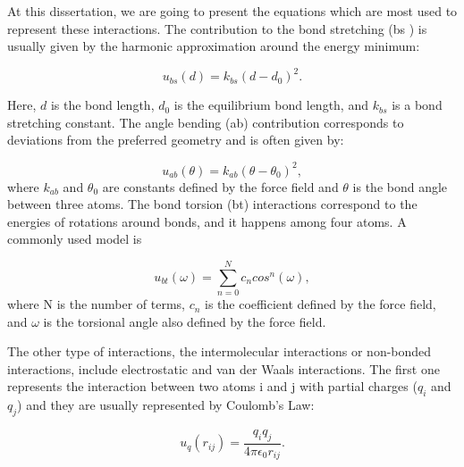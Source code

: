 At this dissertation, we are going to present the equations which are most used to represent these interactions. The contribution to the bond stretching (bs ) is usually given by the harmonic approximation around the energy minimum:

\begin{equation}
u_{bs}(d) = k_{bs} (d - d_{0})^2 .
\end{equation}

Here, $d$ is the bond length, $d_{0}$ is the equilibrium bond length, and $k_{bs}$ is a bond stretching constant. The angle bending (ab) contribution corresponds to deviations from the preferred geometry and is often given by:

\begin{equation}
u_{ab}(\theta) = k_{ab} (\theta - \theta _{0})^2,
\end{equation}
where $k_{ab}$ and $\theta _{0}$ are constants defined by the force field and $\theta$ is the bond angle between three atoms.  The bond torsion (bt) interactions correspond to the energies of rotations around bonds, and it happens among four atoms. A commonly used model is

\begin{equation}
u_{bt}(\omega) = \sum_{n=0}^{N}  c_{n} cos^{n} (\omega) ,
\end{equation}
where N is the number of terms, $c_{n}$ is the coefficient defined by the force field, and $\omega$ is the torsional angle also defined by the force field. 

The other type of interactions, the intermolecular interactions or non-bonded interactions, include electrostatic and van der Waals interactions. The first one represents the interaction between two atoms i and j with partial charges ($q_{i}$ and $q_{j}$) and they are usually represented by Coulomb's Law:

\begin{equation}
u_{q}(r_{ij}) = \frac{q_{i}q_{j}}{4 \pi \epsilon _{0} r_{ij}} .
\end{equation} 

